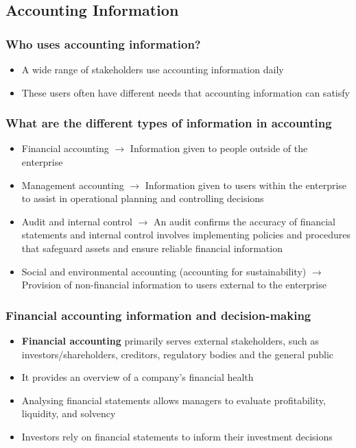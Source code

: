 \documentclass{article}
\begin{document}
	\subsection{Accounting Information}
		\subsubsection{Who uses accounting information?}
			\begin{itemize}
				\item A wide range of stakeholders use accounting information daily
				\item These users often have different needs that accounting information can satisfy
			\end{itemize}

		\subsubsection{What are the different types of information in accounting}
			\begin{itemize}
				\item Financial accounting $\rightarrow$ Information given to people \colorbox{pastel_red}{outside} of the enterprise
				\item Management accounting $\rightarrow$ Information given to users \colorbox{pastel_blue}{within} the enterprise to assist in operational planning and controlling decisions
				\item Audit and internal control $\rightarrow$ An audit confirms the accuracy of financial statements and internal control involves implementing policies and procedures that safeguard assets and ensure reliable financial information
				\item Social and environmental accounting (accounting for sustainability) $\rightarrow$ Provision of non-financial information to users \colorbox{pastel_red}{external} to the enterprise 
			\end{itemize}

		\subsubsection{Financial accounting information and decision-making}
			\begin{itemize}
				\item \textbf{Financial accounting} primarily serves \colorbox{pastel_red}{external stakeholders}, such as investors/shareholders, creditors, regulatory bodies and the general public
				\item It provides an overview of a company's financial health
				\item Analysing financial statements allows managers to evaluate profitability, liquidity, and solvency
				\item Investors rely on financial statements to inform their investment decisions
			\end{itemize}
\end{document}
